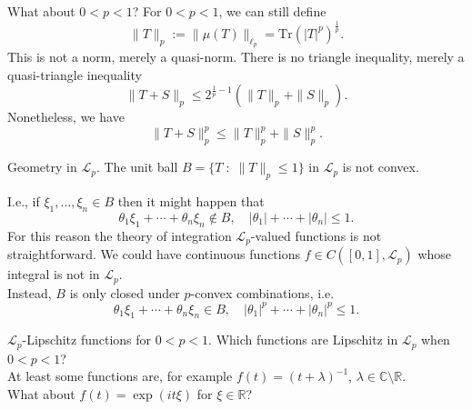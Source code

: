 \documentclass{beamer}
\numberwithin{equation}{section}
\theoremstyle{plain}
\theoremstyle{plain}
\theoremstyle{definition}
\theoremstyle{plain}
\theoremstyle{plain}
\theoremstyle{definition}
\newcommand{\Rl}{\mathbb{R}}
\newcommand{\Cplx}{\mathbb{C}}
\newcommand{\Lc}{\mathcal{L}}
\newcommand{\Tr}{\mathrm{Tr}}
\begin{document}
\begin{frame}{What about $0 < p < 1$?}
    For $0 < p < 1$, we can still define
    $$
        \|T\|_p := \|\mu(T)\|_{\ell_p} = \Tr(|T|^p)^{\frac1p}.
    $$
    This is not a norm, merely a quasi-norm. There is no triangle inequality, merely a quasi-triangle inequality
    $$
        \|T+S\|_p \leq 2^{\frac1p-1}(\|T\|_p+\|S\|_p).
    $$
    \pause
    Nonetheless, we have
    \[
        \|T+S\|_p^p \leq \|T\|_p^p+\|S\|_p^p.
    \]
\end{frame}


\begin{frame}{Geometry in $\Lc_p.$}
    The unit ball $B = \{T\;:\; \|T\|_p\leq 1\}$ in $\Lc_p$ is not convex.

    I.e., if $\xi_1,\ldots,\xi_n\in B$ then it might happen that
    \[
        \theta_1\xi_1+\cdots+\theta_n\xi_n\notin B,\quad |\theta_1|+\cdots+|\theta_n|\leq 1.
    \]
    For this reason the theory of integration $\Lc_p$-valued functions is not straightforward. We could have continuous functions $f \in C([0,1],\Lc_p)$
    whose integral is not in $\Lc_p.$\\
    \pause
    Instead, $B$ is only closed under $p$-convex combinations, i.e.
    \[
        \theta_1\xi_1+\cdots+\theta_n \xi_n \in B,\quad |\theta_1|^p+\cdots+|\theta_n|^p \leq 1.
    \]
\end{frame}


\begin{frame}{$\Lc_p$-Lipschitz functions for $0 < p < 1.$}
    Which functions are Lipschitz in $\Lc_p$ when $0 < p < 1$? \\
    \pause
    At least some functions are, for example $f(t) = (t+\lambda)^{-1}$, $\lambda \in \Cplx\setminus \Rl.$\\
    \pause
    What about $f(t) = \exp(it\xi)$ for $\xi\in \Rl$?
\end{frame}
\end{document}
